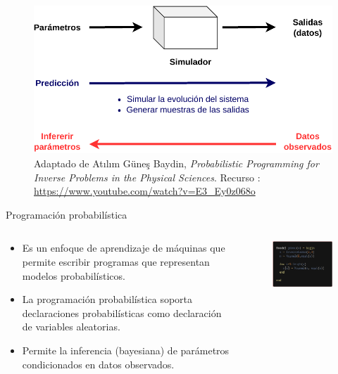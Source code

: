 \documentclass[11pt]{beamer}
\begin{document}
\begin{frame}
	\begin{figure}
		\includegraphics[scale=0.8]{images/turing_ode-simulators-4.pdf}
		\caption{\scriptsize Adaptado de Atılım Güneş Baydin, \textit{Probabilistic Programming for Inverse Problems in the Physical Sciences}. Recurso : \url{https://www.youtube.com/watch?v=E3_Ey0z068o}}
	\end{figure}
\end{frame}

\begin{frame}{Programación probabilística}
	\begin{columns}
\begin{column}{0.5\textwidth}

	\begin{itemize}
	\item Es un enfoque de aprendizaje de máquinas que permite escribir programas que representan modelos probabilísticos.
	\item La programación probabilística soporta declaraciones probabilísticas como declaración de variables aleatorias.
	\item Permite la inferencia (bayesiana) de parámetros condicionados en datos observados.
	\end{itemize}
\end{column}
\begin{column}{0.5\textwidth}
	\begin{figure}
		\includegraphics[scale=0.4]{images/prob_prog}
	\end{figure}
\end{column}

\end{columns}
\end{frame}
\end{document}

